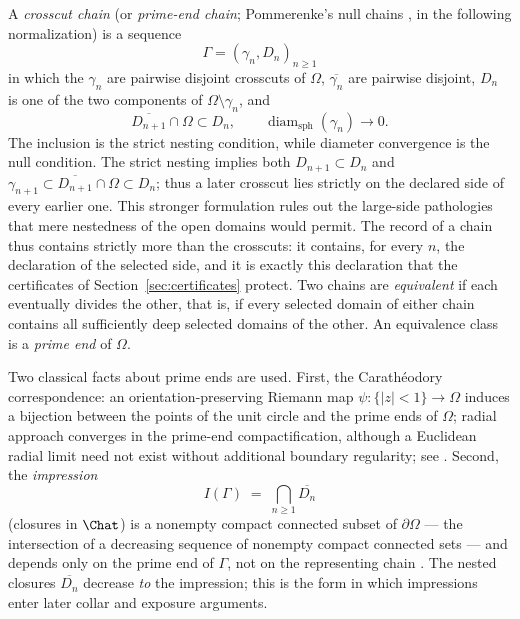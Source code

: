 A \emph{crosscut chain} (or \emph{prime-end chain}; Pommerenke's null
chains \cite{Pom92}, in the following normalization) is a sequence
\[
\Gamma=(\gamma_n,D_n)_{n\ge1}
\]
in which the $\gamma_n$ are pairwise disjoint crosscuts of $\Omega$,
$\overline{\gamma_n}$ are pairwise disjoint,
$D_n$ is one of the two components of
$\Omega\setminus\gamma_n$, and
\begin{equation}\label{eq:A-null-chain}
 \overline{D_{n+1}}\cap\Omega\subset D_n,
 \qquad
 \operatorname{diam}_{\mathrm{sph}}(\gamma_n)\longrightarrow0 .
\end{equation}
The inclusion is the strict nesting condition, while diameter convergence
is the null condition.  The strict nesting implies both
$D_{n+1}\subset D_n$ and
$\gamma_{n+1}\subset\overline{D_{n+1}}\cap\Omega\subset D_n$; thus a
later crosscut lies strictly on the declared side of every earlier one.
This stronger formulation rules out the large-side pathologies that mere
nestedness of the open domains would permit.
The record of a chain thus contains strictly more than the crosscuts: it
contains, for every $n$, the declaration of the selected side, and it is
exactly this declaration that the certificates of
Section~\ref{sec:certificates} protect.  Two chains are
\emph{equivalent} if each eventually divides the other, that is, if every
selected domain of either chain contains all sufficiently deep selected
domains of the other.  An equivalence class is a \emph{prime end} of
$\Omega$.

Two classical facts about prime ends are used.  First, the
Carath\'eodory correspondence: an orientation-preserving Riemann map
$\psi\colon\{|z|<1\}\to\Omega$ induces a bijection between the points of
the unit circle and the prime ends of $\Omega$; radial approach converges
in the prime-end compactification, although a Euclidean radial limit need
not exist without additional boundary regularity; see
\cite[Chapter~2]{Pom92}.  Second, the
\emph{impression}
\[
I(\Gamma)\;=\;\bigcap_{n\ge1}\overline{D_n}
\]
(closures in $\Chat$) is a nonempty compact connected subset of
$\partial\Omega$ --- the intersection of a decreasing sequence of
nonempty compact connected sets --- and depends only on the prime end of
$\Gamma$, not
on the representing chain \cite{Pom92}.  The nested closures
$\overline{D_n}$ decrease \emph{to} the impression; this is the form in
which impressions enter later collar and exposure arguments.

